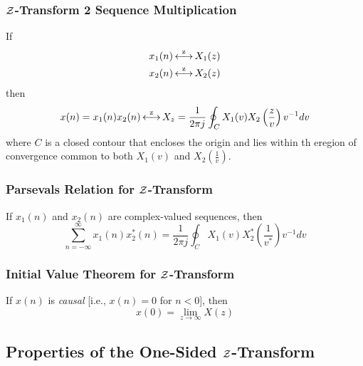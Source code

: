 \subsubsection{\texorpdfstring{$\operatorname{\mathcal{Z}}$-Transform}{Z-Transform} 2 Sequence Multiplication}\label{subsubsec:Z-Transform 2 Sequence Multiplication}
If
\begin{equation*}
  \begin{aligned}
    x_{1}(n) &\operatorname{\overset{z}{\longleftrightarrow}} X_{1}(z) \\
    x_{2}(n) &\operatorname{\overset{z}{\longleftrightarrow}} X_{2}(z) \\
  \end{aligned}
\end{equation*}
then
\begin{equation}\label{eq:Z-Transform 2 Sequence Multiplication}
  x(n) = x_{1}(n)x_{2}(n) \operatorname{\overset{z}{\longleftrightarrow}} X_{z} = \frac{1}{2 \pi j} \oint_{C} X_{1}(v)X_{2}\left( \frac{z}{v} \right) v^{-1} dv
\end{equation}
where $C$ is a closed contour that encloses the origin and lies within th eregion of convergence common to both $X_{1}(v)$ and $X_{2}(\frac{1}{v})$.

\subsubsection{Parsevals Relation for \texorpdfstring{$\operatorname{\mathcal{Z}}$-Transform}{Z-Transform}}\label{subsubsec:Parsevals Relation for Z-Transform}
If $x_{1}(n)$ and $x_{2}(n)$ are complex-valued sequences, then
\begin{equation}\label{eq:Parsevals Relation for Z-Transform}
  \sum\limits_{n=-\infty}^{\infty} x_{1}(n)x_{2}^{*}(n) = \frac{1}{2 \pi j} \oint_{C} X_{1}(v)X_{2}^{*} \left( \frac{1}{v^{*}} \right) v^{-1} dv
\end{equation}

\subsubsection{Initial Value Theorem for \texorpdfstring{$\operatorname{\mathcal{Z}}$-Transform}{Z-Transform}}\label{subsubsec:Initial Value Theorem for Z-Transform}
If $x(n)$ is \emph{causal} [i.e., $x(n)=0$ for $n<0$], then
\begin{equation}\label{eq:Initial Value Theorem for Z-Transform}
  x(0) = \lim\limits_{z\rightarrow\infty}X(z)
\end{equation}

\subsection{Properties of the One-Sided \texorpdfstring{$\operatorname{\mathcal{Z}}$-Transform}{Z-Transform}}\label{subsec:One-Sided Z-Transform Properties}
\begin{propertylist}
\item 
\end{propertylist}

